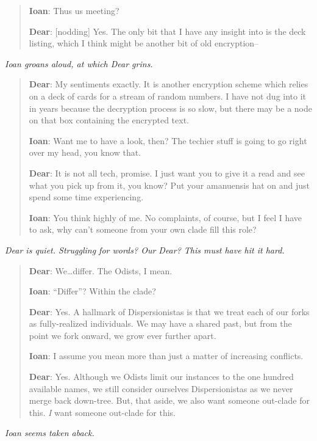 \begin{quote}
\textbf{Ioan}: Thus us meeting?

\textbf{Dear}: {[}nodding{]} Yes. The only bit that I have any insight into is the deck listing, which I think might be another bit of old encryption--
\end{quote}

\emph{Ioan groans aloud, at which Dear grins.}

\begin{quote}
\textbf{Dear}: My sentiments exactly. It is another encryption scheme which relies on a deck of cards for a stream of random numbers. I have not dug into it in years because the decryption process is so slow, but there may be a node on that box containing the encrypted text.

\textbf{Ioan}: Want me to have a look, then? The techier stuff is going to go right over my head, you know that.

\textbf{Dear}: It is not all tech, promise. I just want you to give it a read and see what you pick up from it, you know? Put your amanuensis hat on and just spend some time experiencing.

\textbf{Ioan}: You think highly of me. No complaints, of course, but I feel I have to ask, why can't someone from your own clade fill this role?
\end{quote}

\emph{Dear is quiet. Struggling for words? Our Dear? This must have hit it hard.}

\begin{quote}
\textbf{Dear}: We\ldots{}differ. The Odists, I mean.

\textbf{Ioan}: ``Differ''? Within the clade?

\textbf{Dear}: Yes. A hallmark of Dispersionistas is that we treat each of our forks as fully-realized individuals. We may have a shared past, but from the point we fork onward, we grow ever further apart.

\textbf{Ioan}: I assume you mean more than just a matter of increasing conflicts.

\textbf{Dear}: Yes. Although we Odists limit our instances to the one hundred available names, we still consider ourselves Dispersionistas as we never merge back down-tree. But, that aside, we also want someone out-clade for this. \emph{I} want someone out-clade for this.
\end{quote}

\emph{Ioan seems taken aback.}

